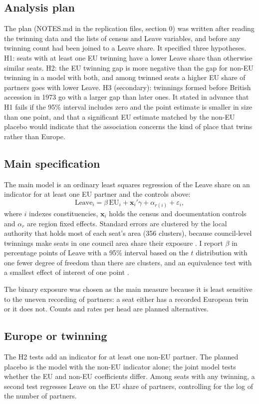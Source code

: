 \documentclass[11pt,a4paper]{article}
\begin{document}
\subsection{Analysis plan}
The plan (NOTES.md in the replication files, section 0) was written after reading the twinning data and the lists of census and Leave variables, and before any twinning count had been joined to a Leave share. It specified three hypotheses. H1: seats with at least one EU twinning have a lower Leave share than otherwise similar seats. H2: the EU twinning gap is more negative than the gap for non-EU twinning in a model with both, and among twinned seats a higher EU share of partners goes with lower Leave. H3 (secondary): twinnings formed before British accession in 1973 go with a larger gap than later ones. It stated in advance that H1 fails if the 95\% interval includes zero and the point estimate is smaller in size than one point, and that a significant EU estimate matched by the non-EU placebo would indicate that the association concerns the kind of place that twins rather than Europe.

\subsection{Main specification}
The main model is an ordinary least squares regression of the Leave share on an indicator for at least one EU partner and the controls above:
\begin{equation}
\text{Leave}_{i} = \beta\,\text{EU}_{i} + \mathbf{x}_{i}'\gamma + \alpha_{r(i)} + \varepsilon_{i},
\end{equation}
where $i$ indexes constituencies, $\mathbf{x}_i$ holds the census and documentation controls and $\alpha_r$ are region fixed effects. Standard errors are clustered by the local authority that holds most of each seat's area (356 clusters), because council-level twinnings make seats in one council area share their exposure \citep{cameron2015}. I report $\beta$ in percentage points of Leave with a 95\% interval based on the $t$ distribution with one fewer degree of freedom than there are clusters, and an equivalence test with a smallest effect of interest of one point \citep{lakens2017}.

The binary exposure was chosen as the main measure because it is least sensitive to the uneven recording of partners: a seat either has a recorded European twin or it does not. Counts and rates per head are planned alternatives.

\subsection{Europe or twinning}
The H2 tests add an indicator for at least one non-EU partner. The planned placebo is the model with the non-EU indicator alone; the joint model tests whether the EU and non-EU coefficients differ. Among seats with any twinning, a second test regresses Leave on the EU share of partners, controlling for the log of the number of partners.
\end{document}
